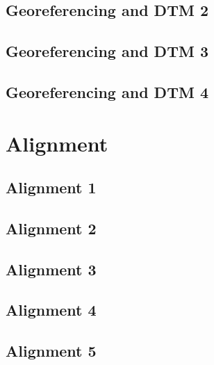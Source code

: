 \documentclass{scrartcl}
\begin{document}
\subsection{Georeferencing and DTM 2}
\label{sec:georef_tin_2}
\clearpage

\subsection{Georeferencing and DTM 3} %
\label{sec:georef_tin_3}
\clearpage

\subsection{Georeferencing and DTM 4} %
\label{sec:georef_tin_4}
\clearpage

\section{Alignment}
\label{sec:alignment}

\subsection{Alignment 1}
\label{sec:align_1}
\clearpage

\subsection{Alignment 2}
\label{sec:align_2}
\clearpage

\subsection{Alignment 3}
\label{sec:align_3}
\clearpage

\subsection{Alignment 4}
\label{sec:align_4}
\clearpage

\subsection{Alignment 5}
\label{sec:align_5}
\clearpage
\end{document}
